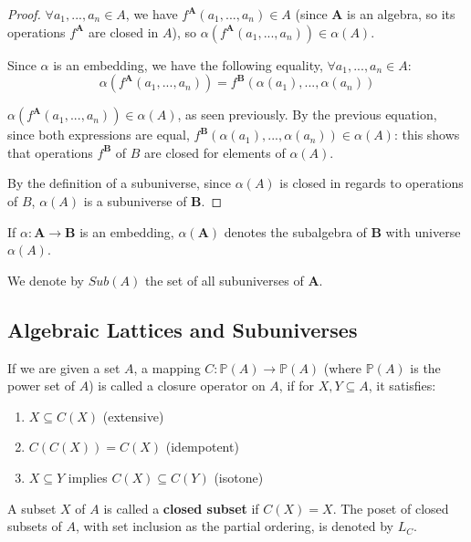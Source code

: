 \begin{proof}
  $\forall a_1,...,a_n \in A$, we have $f^{\boldsymbol{A}}(a_1,...,a_n) \in A$
  (since $\boldsymbol{A}$ is an algebra, so its operations $f^{\boldsymbol{A}}$ are closed in $A$), so
  $\alpha(f^{\boldsymbol{A}}(a_1,...,a_n)) \in \alpha(A)$.

  Since $\alpha$ is an embedding, we have the following equality, $\forall a_1,...,a_n \in A$:
    \begin{equation}
      \alpha (f^{\boldsymbol{A}}(a_1,...,a_n)) =
      f^{\boldsymbol{B}}(\alpha(a_1),...,\alpha(a_n))
  \end{equation}

  $\alpha (f^{\boldsymbol{A}}(a_1,...,a_n)) \in \alpha(A)$, as seen
  previously. By the previous equation, since both expressions are equal,
  $f^{\boldsymbol{B}}(\alpha(a_1),...,\alpha(a_n)) \in \alpha(A)$: this shows
  that operations $f^{\boldsymbol{B}}$ of $B$ are closed for elements of
  $\alpha(A)$.

  By the definition of a subuniverse, since $\alpha(A)$ is closed in regards to
  operations of $B$, $\alpha(A)$ is a subuniverse of $\boldsymbol{B}$.


\end{proof}

\begin{definition}  If $\alpha: \boldsymbol{A} \rightarrow \boldsymbol{B}$ is
an embedding, $\alpha(\boldsymbol{A})$ denotes the subalgebra of
$\boldsymbol{B}$ with universe $\alpha(A)$.
\end{definition}

\begin{notation} We denote by $Sub(A)$ the set of all subuniverses of
$\boldsymbol{A}$.
\end{notation}

\subsection{Algebraic Lattices and Subuniverses}

\begin{definition}[closure] If we are given a set $A$, a mapping $C:
\mathbb{P}(A) \rightarrow \mathbb{P}(A)$ (where $\mathbb{P}(A)$ is the power set
of $A$) is called a closure operator on $A$, if for $X,Y \subseteq A$, it
satisfies:
  \begin{enumerate}
  \item $X \subseteq C(X)$ (extensive)
  \item $C(C(X)) = C(X)$ (idempotent)
  \item $X \subseteq Y$ implies $C(X) \subseteq C(Y)$ (isotone)
  \end{enumerate}

  A subset $X$ of $A$ is called a \textbf{closed subset} if $C(X) = X$. The
poset of closed subsets of $A$, with set inclusion as the partial ordering, is
denoted by $L_C$.
\end{definition}

